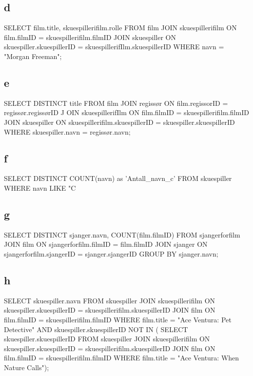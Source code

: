 \documentclass[12pt,a4paper]{article}
\begin{document}
	\subsection{d}
	\begin{spverbatim}
SELECT film.title, skuespillerifilm.rolle FROM film 
JOIN skuespillerifilm ON film.filmID = skuespillerifilm.filmID 
JOIN skuespiller ON skuespiller.skuespillerID = skuespillerifIlm.skuespillerID 
WHERE navn = "Morgan Freeman";
	\end{spverbatim}	
	
	\subsection{e}
	\begin{spverbatim}
SELECT DISTINCT  title 
FROM film 
JOIN regissør ON film.regissorID = regissør.regissørID J
OIN skuespillerifIlm ON film.filmID = skuespillerifilm.filmID 
JOIN skuespiller ON skuespillerifilm.skuespillerID = skuespiller.skuespillerID
WHERE skuespiller.navn = regissør.navn;
	\end{spverbatim}	
	
	\subsection{f}
	\begin{spverbatim}
SELECT DISTINCT COUNT(navn) as 'Antall_navn_c' FROM skuespiller WHERE navn LIKE "C%
	\end{spverbatim}	
	
	\subsection{g}
	\begin{spverbatim}
SELECT DISTINCT sjanger.navn, COUNT(film.filmID)
FROM sjangerforfilm
JOIN film ON sjangerforfilm.filmID = film.filmID 
JOIN sjanger ON sjangerforfilm.sjangerID = sjanger.sjangerID
GROUP BY sjanger.navn; 
	\end{spverbatim}
	
	\subsection{h}
	\begin{spverbatim}
SELECT skuespiller.navn
FROM skuespiller JOIN skuespillerifilm ON skuespiller.skuespillerID 
= skuespillerifilm.skuespillerID
JOIN film ON film.filmID = skuespillerifilm.filmID
WHERE film.title = "Ace Ventura: Pet Detective" 
AND skuespiller.skuespillerID NOT IN (
SELECT skuespiller.skuespillerID
FROM skuespiller JOIN skuespillerifilm ON skuespiller.skuespillerID 
= skuespillerifilm.skuespillerID
JOIN film ON film.filmID = skuespillerifilm.filmID
WHERE film.title = "Ace Ventura: When Nature Calls");
	\end{spverbatim}	
	
\end{document}
